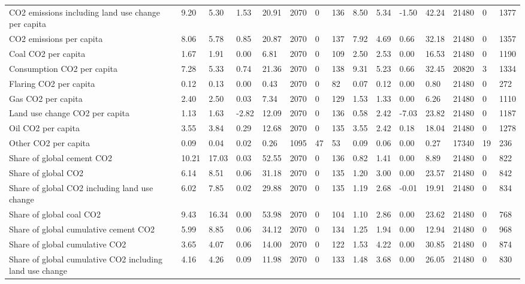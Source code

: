 \begin{longtable}{lllllllllllllll}
CO2 emissions including land use change per capita & 9.20 & 5.30 & 1.53 & 20.91 & 2070 & 0 & 136 & 8.50 & 5.34 & -1.50 & 42.24 & 21480 & 0 & 1377\\
CO2 emissions per capita & 8.06 & 5.78 & 0.85 & 20.87 & 2070 & 0 & 137 & 7.92 & 4.69 & 0.66 & 32.18 & 21480 & 0 & 1357\\
Coal CO2 per capita & 1.67 & 1.91 & 0.00 & 6.81 & 2070 & 0 & 109 & 2.50 & 2.53 & 0.00 & 16.53 & 21480 & 0 & 1190\\
\addlinespace
Consumption CO2 per capita & 7.28 & 5.33 & 0.74 & 21.36 & 2070 & 0 & 138 & 9.31 & 5.23 & 0.66 & 32.45 & 20820 & 3 & 1334\\
Flaring CO2 per capita & 0.12 & 0.13 & 0.00 & 0.43 & 2070 & 0 & 82 & 0.07 & 0.12 & 0.00 & 0.80 & 21480 & 0 & 272\\
Gas CO2 per capita & 2.40 & 2.50 & 0.03 & 7.34 & 2070 & 0 & 129 & 1.53 & 1.33 & 0.00 & 6.26 & 21480 & 0 & 1110\\
Land use change CO2 per capita & 1.13 & 1.63 & -2.82 & 12.09 & 2070 & 0 & 136 & 0.58 & 2.42 & -7.03 & 23.82 & 21480 & 0 & 1187\\
Oil CO2 per capita & 3.55 & 3.84 & 0.29 & 12.68 & 2070 & 0 & 135 & 3.55 & 2.42 & 0.18 & 18.04 & 21480 & 0 & 1278\\
\addlinespace
Other CO2 per capita & 0.09 & 0.04 & 0.02 & 0.26 & 1095 & 47 & 53 & 0.09 & 0.06 & 0.00 & 0.27 & 17340 & 19 & 236\\
Share of global cement CO2 & 10.21 & 17.03 & 0.03 & 52.55 & 2070 & 0 & 136 & 0.82 & 1.41 & 0.00 & 8.89 & 21480 & 0 & 822\\
Share of global CO2 & 6.14 & 8.51 & 0.06 & 31.18 & 2070 & 0 & 135 & 1.20 & 3.00 & 0.00 & 23.57 & 21480 & 0 & 842\\
Share of global CO2 including land use change & 6.02 & 7.85 & 0.02 & 29.88 & 2070 & 0 & 135 & 1.19 & 2.68 & -0.01 & 19.91 & 21480 & 0 & 834\\
Share of global coal CO2 & 9.43 & 16.34 & 0.00 & 53.98 & 2070 & 0 & 104 & 1.10 & 2.86 & 0.00 & 23.62 & 21480 & 0 & 768\\
\addlinespace
Share of global cumulative cement CO2 & 5.99 & 8.85 & 0.06 & 34.12 & 2070 & 0 & 134 & 1.25 & 1.94 & 0.00 & 12.94 & 21480 & 0 & 968\\
Share of global cumulative CO2 & 3.65 & 4.07 & 0.06 & 14.00 & 2070 & 0 & 122 & 1.53 & 4.22 & 0.00 & 30.85 & 21480 & 0 & 874\\
Share of global cumulative CO2 including land use change & 4.16 & 4.26 & 0.09 & 11.98 & 2070 & 0 & 133 & 1.48 & 3.68 & 0.00 & 26.05 & 21480 & 0 & 830\\

\end{longtable}
